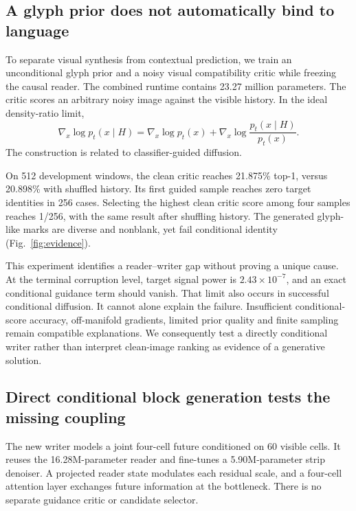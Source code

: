 \subsection*{A glyph prior does not automatically bind to language}
To separate visual synthesis from contextual prediction, we train an
unconditional glyph prior and a noisy visual compatibility critic while
freezing the causal reader. The combined runtime contains 23.27 million
parameters. The critic scores an arbitrary noisy image against the visible
history. In the ideal density-ratio limit,
\begin{equation}
\nabla_x\log p_t(x\mid H)=\nabla_x\log p_t(x)
+\nabla_x\log\frac{p_t(x\mid H)}{p_t(x)}.
\end{equation}
The construction is related to classifier-guided diffusion\cite{guidance}.

On 512 development windows, the clean critic reaches 21.875\% top-1, versus
20.898\% with shuffled history. Its first guided sample reaches zero target
identities in 256 cases. Selecting the highest clean critic score among four
samples reaches 1/256, with the same result after shuffling history. The
generated glyph-like marks are diverse and nonblank, yet fail conditional
identity (Fig.~\ref{fig:evidence}).

This experiment identifies a reader--writer gap without proving a unique
cause. At the terminal corruption level, target signal power is
$2.43\times10^{-7}$, and an exact conditional guidance term should vanish.
That limit also occurs in successful conditional diffusion. It cannot alone
explain the failure. Insufficient conditional-score accuracy, off-manifold
gradients, limited prior quality and finite sampling remain compatible
explanations. We consequently test a directly conditional writer rather than
interpret clean-image ranking as evidence of a generative solution.

\subsection*{Direct conditional block generation tests the missing coupling}
The new writer models a joint four-cell future conditioned on 60 visible
cells. It reuses the 16.28M-parameter reader and fine-tunes a 5.90M-parameter
strip denoiser. A projected reader state modulates each residual scale, and a
four-cell attention layer exchanges future information at the bottleneck.
There is no separate guidance critic or candidate selector.

